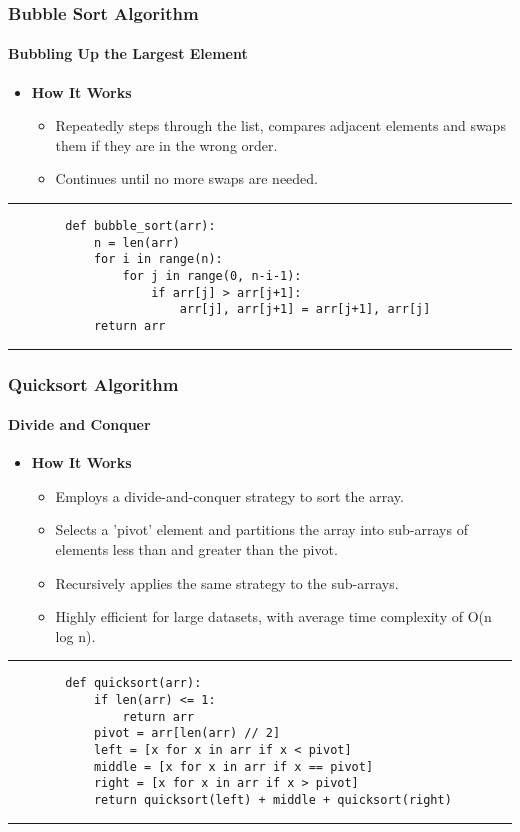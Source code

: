 \documentclass[compress,12pt,bookmark]{beamer}
\begin{document}
\begin{frame}[fragile]
    \frametitle{Bubble Sort Algorithm}
    \framesubtitle{Bubbling Up the Largest Element}

    \begin{itemize}
        \item \textbf{How It Works}
              \begin{itemize}
                  \item Repeatedly steps through the list, compares adjacent elements and swaps them if they are in the wrong order.
                  \item Continues until no more swaps are needed.
              \end{itemize}
    \end{itemize}

    \rule{\textwidth}{1pt}
    \scriptsize
    \begin{verbatim}
        def bubble_sort(arr):
            n = len(arr)
            for i in range(n):
                for j in range(0, n-i-1):
                    if arr[j] > arr[j+1]:
                        arr[j], arr[j+1] = arr[j+1], arr[j]
            return arr
    \end{verbatim}
    \rule{\textwidth}{1pt}
\end{frame}

\begin{frame}[fragile]
    \frametitle{Quicksort Algorithm}
    \framesubtitle{Divide and Conquer}

    \begin{itemize}
        \item \textbf{How It Works}
              \begin{itemize}
                  \item Employs a divide-and-conquer strategy to sort the array.
                  \item Selects a 'pivot' element and partitions the array into sub-arrays of elements less than and greater than the pivot.
                  \item Recursively applies the same strategy to the sub-arrays.
                  \item Highly efficient for large datasets, with average time complexity of O(n log n).
              \end{itemize}
    \end{itemize}

    \rule{\textwidth}{1pt}
    \scriptsize
    \begin{verbatim}
        def quicksort(arr):
            if len(arr) <= 1:
                return arr
            pivot = arr[len(arr) // 2]
            left = [x for x in arr if x < pivot]
            middle = [x for x in arr if x == pivot]
            right = [x for x in arr if x > pivot]
            return quicksort(left) + middle + quicksort(right)
    \end{verbatim}
    \rule{\textwidth}{1pt}
\end{frame}
\end{document}
